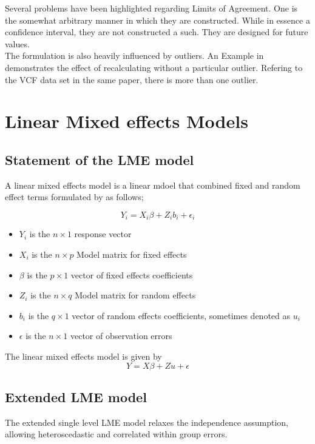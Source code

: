 \documentclass[12pt, a4paper]{report}
\theoremstyle{plain}
\theoremstyle{definition}
\theoremstyle{remark}
\begin{document}
	Several problems have been highlighted regarding Limits of
	Agreement. One is the somewhat arbitrary manner in which they are
	constructed. While in essence a confidence interval, they are not
	constructed a such. They are designed for future values.
	\\
	The formulation is also heavily influenced by outliers. An Example
	in \citet*{BA83} demonstrates the effect of recalculating without
	a particular outlier. Refering to the VCF data set in the same
	paper, there is more than one outlier.
	
	
	\chapter{Linear Mixed effects Models}
\section{Statement of the LME model}
A linear mixed effects model is a linear mdoel that combined fixed and random effect terms formulated by \citet{LW82} as follows;

\begin{displaymath}
Y_{i} =X_{i}\beta + Z_{i}b_{i} + \epsilon_{i}
\end{displaymath}
\begin{itemize}
	
	\item $Y_{i}$ is the $n \times 1$ response vector \item $X_{i}$ is
	the $n \times p$ Model matrix for fixed effects \item $\beta$ is
	the $p \times 1$ vector of fixed effects coefficients \item
	$Z_{i}$ is the $n \times q$ Model matrix for random effects \item
	$b_{i}$ is the $q \times 1$ vector of random effects coefficients,
	sometimes denoted as $u_{i}$ \item $\epsilon$ is the $n \times 1$
	vector of observation errors
\end{itemize}


The linear mixed effects model is given by
\begin{equation}
Y = X\beta + Zu + \epsilon
\end{equation}
\section{Extended LME model}
The extended single level LME model relaxes the independence assumption, allowing heteroscedastic and correlated within group errors.
\end{document}
